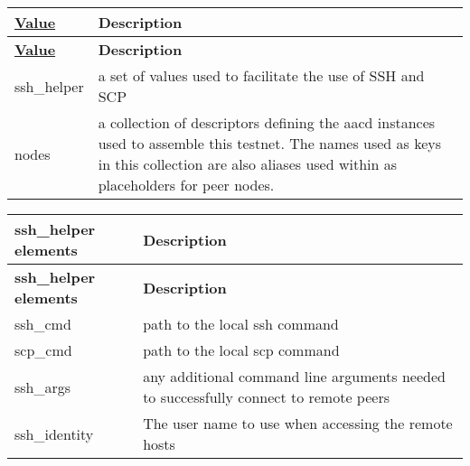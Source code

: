 \tabulinesep=1mm
\begin{longtabu} spread 0pt [c]{*{2}{|X[-1]}|}
\hline
\rowcolor{\tableheadbgcolor}\textbf{ \mbox{\hyperlink{struct_value}{Value}}  }&\textbf{ Description   }\\
\endfirsthead
\hline
\endfoot
\hline
\rowcolor{\tableheadbgcolor}\textbf{ \mbox{\hyperlink{struct_value}{Value}}  }&\textbf{ Description   }\\
\endhead
ssh\+\_\+helper  &a set of values used to facilitate the use of S\+SH and S\+CP   \\
nodes  &a collection of descriptors defining the aacd instances used to assemble this testnet. The names used as keys in this collection are also aliases used within as placeholders for peer nodes.   \\
\end{longtabu}


\tabulinesep=1mm
\begin{longtabu} spread 0pt [c]{*{2}{|X[-1]}|}
\hline
\rowcolor{\tableheadbgcolor}\textbf{ ssh\+\_\+helper elements  }&\textbf{ Description   }\\
\endfirsthead
\hline
\endfoot
\hline
\rowcolor{\tableheadbgcolor}\textbf{ ssh\+\_\+helper elements  }&\textbf{ Description   }\\
\endhead
ssh\+\_\+cmd  &path to the local ssh command   \\
scp\+\_\+cmd  &path to the local scp command   \\
ssh\+\_\+args  &any additional command line arguments needed to successfully connect to remote peers   \\
ssh\+\_\+identity  &The user name to use when accessing the remote hosts   \\
\end{longtabu}


